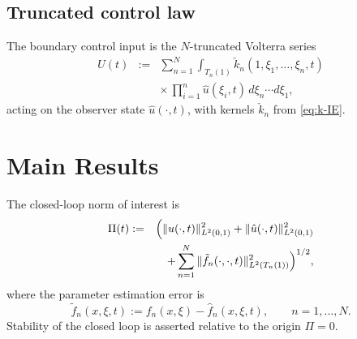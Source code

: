 \documentclass[journal,twoside,web]{ieeecolor}
\begin{document}
\subsection{Truncated control law}\label{sec:control-law}

The boundary control input is the $N$-truncated Volterra series
\begin{eqnarray}
U(t) &:=& \sum_{n=1}^N\int_{T_n(1)}\check k_n(1,\xi_1,\ldots,\xi_n,t) \nonumber\\
&& \times\,\prod_{i=1}^n\hat u(\xi_i,t)\,d\xi_n\cdots d\xi_1, \label{eq:U-def}
\end{eqnarray}
acting on the observer state $\hat u(\cdot,t)$, with kernels $\check k_n$ from \eqref{eq:k-IE}.

\section{Main Results}\label{sec:theorem}

The closed-loop norm of interest is
\begin{eqnarray}
\Pi(t) &:=& \Bigl(\|u(\cdot,t)\|^2_{L^2(0,1)}+\|\hat u(\cdot,t)\|^2_{L^2(0,1)} \nonumber\\
&& +\sum_{n=1}^N\|\tilde f_n(\cdot,\cdot,t)\|^2_{L^2(T_n(1))}\Bigr)^{1/2}, \label{eq:Pi-def}
\end{eqnarray}
where the parameter estimation error is
\begin{equation}\label{eq:ftilde-def}
\tilde f_n(x,\xi,t):=f_n(x,\xi)-\hat f_n(x,\xi,t),\qquad n=1,\ldots,N.
\end{equation}
Stability of the closed loop is asserted relative to the origin $\Pi=0$. 
\end{document}
